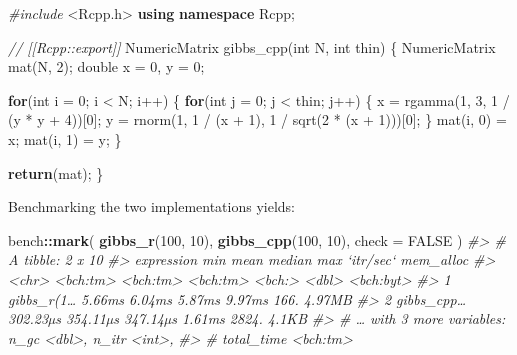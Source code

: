 \documentclass[]{book}
\newenvironment{Shaded}{\begin{snugshade}}{\end{snugshade}}
\newcommand{\CommentTok}[1]{\textcolor[rgb]{0.37,0.37,0.37}{\textit{#1}}}
\newcommand{\ControlFlowTok}[1]{\textcolor[rgb]{0.27,0.27,0.27}{\textbf{#1}}}
\newcommand{\DataTypeTok}[1]{\textcolor[rgb]{0.27,0.27,0.27}{#1}}
\newcommand{\DecValTok}[1]{\textcolor[rgb]{0.06,0.06,0.06}{#1}}
\newcommand{\ImportTok}[1]{#1}
\newcommand{\KeywordTok}[1]{\textcolor[rgb]{0.27,0.27,0.27}{\textbf{#1}}}
\newcommand{\NormalTok}[1]{#1}
\newcommand{\OperatorTok}[1]{\textcolor[rgb]{0.43,0.43,0.43}{\textbf{#1}}}
\newcommand{\OtherTok}[1]{\textcolor[rgb]{0.37,0.37,0.37}{#1}}
\newcommand{\PreprocessorTok}[1]{\textcolor[rgb]{0.37,0.37,0.37}{\textit{#1}}}
\begin{document}
\begin{Shaded}
\begin{Highlighting}[]
\PreprocessorTok{#include }\ImportTok{<Rcpp.h>}
\KeywordTok{using} \KeywordTok{namespace}\NormalTok{ Rcpp;}

\CommentTok{// [[Rcpp::export]]}
\NormalTok{NumericMatrix gibbs_cpp(}\DataTypeTok{int}\NormalTok{ N, }\DataTypeTok{int}\NormalTok{ thin) \{}
\NormalTok{  NumericMatrix mat(N, }\DecValTok{2}\NormalTok{);}
  \DataTypeTok{double}\NormalTok{ x = }\DecValTok{0}\NormalTok{, y = }\DecValTok{0}\NormalTok{;}

  \ControlFlowTok{for}\NormalTok{(}\DataTypeTok{int}\NormalTok{ i = }\DecValTok{0}\NormalTok{; i < N; i++) \{}
    \ControlFlowTok{for}\NormalTok{(}\DataTypeTok{int}\NormalTok{ j = }\DecValTok{0}\NormalTok{; j < thin; j++) \{}
\NormalTok{      x = rgamma(}\DecValTok{1}\NormalTok{, }\DecValTok{3}\NormalTok{, }\DecValTok{1}\NormalTok{ / (y * y + }\DecValTok{4}\NormalTok{))[}\DecValTok{0}\NormalTok{];}
\NormalTok{      y = rnorm(}\DecValTok{1}\NormalTok{, }\DecValTok{1}\NormalTok{ / (x + }\DecValTok{1}\NormalTok{), }\DecValTok{1}\NormalTok{ / sqrt(}\DecValTok{2}\NormalTok{ * (x + }\DecValTok{1}\NormalTok{)))[}\DecValTok{0}\NormalTok{];}
\NormalTok{    \}}
\NormalTok{    mat(i, }\DecValTok{0}\NormalTok{) = x;}
\NormalTok{    mat(i, }\DecValTok{1}\NormalTok{) = y;}
\NormalTok{  \}}

  \ControlFlowTok{return}\NormalTok{(mat);}
\NormalTok{\}}
\end{Highlighting}
\end{Shaded}

Benchmarking the two implementations yields:

\begin{Shaded}
\begin{Highlighting}[]
\NormalTok{bench}\OperatorTok{::}\KeywordTok{mark}\NormalTok{(}
  \KeywordTok{gibbs_r}\NormalTok{(}\DecValTok{100}\NormalTok{, }\DecValTok{10}\NormalTok{),}
  \KeywordTok{gibbs_cpp}\NormalTok{(}\DecValTok{100}\NormalTok{, }\DecValTok{10}\NormalTok{),}
  \DataTypeTok{check =} \OtherTok{FALSE}
\NormalTok{)}
\CommentTok{#> # A tibble: 2 x 10}
\CommentTok{#>   expression      min     mean   median    max `itr/sec` mem_alloc}
\CommentTok{#>   <chr>      <bch:tm> <bch:tm> <bch:tm> <bch:>     <dbl> <bch:byt>}
\CommentTok{#> 1 gibbs_r(1…   5.66ms   6.04ms   5.87ms 9.97ms      166.    4.97MB}
\CommentTok{#> 2 gibbs_cpp… 302.23µs 354.11µs 347.14µs 1.61ms     2824.     4.1KB}
\CommentTok{#> # … with 3 more variables: n_gc <dbl>, n_itr <int>,}
\CommentTok{#> #   total_time <bch:tm>}
\end{Highlighting}
\end{Shaded}
\end{document}
